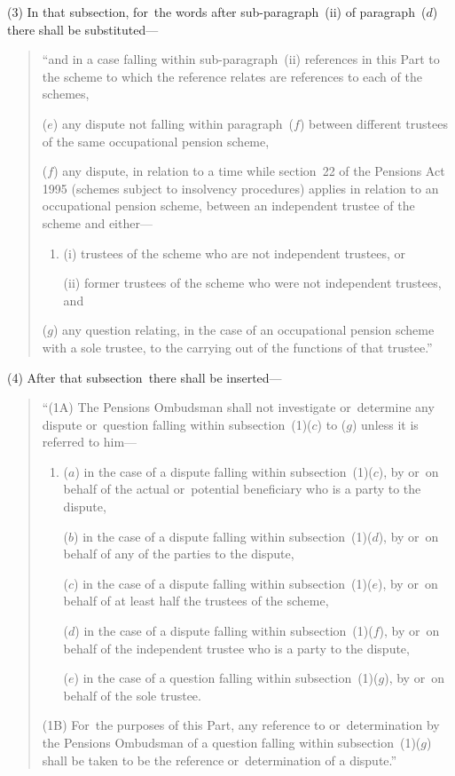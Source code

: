 \documentclass[12pt,a4paper]{article}
\begin{document}
(3) In that subsection, for~the words after sub-paragraph~(ii)  of paragraph~($d$)  there shall be substituted—
\begin{quotation}
“and in a case falling within sub-paragraph~(ii)  references in this Part to the scheme to which the reference relates are references to each of the schemes,

($e$) any dispute not falling within paragraph~($f$)  between different trustees of the same occupational pension scheme,

($f$) any dispute, in relation to a time while section~22 of the Pensions Act 1995 (schemes subject to insolvency procedures) applies in relation to an occupational pension scheme, between an independent trustee of the scheme and either—
\begin{enumerate}\item[]
\begin{sloppypar}
(i) trustees of the scheme who are not independent trustees, or
\end{sloppypar}

(ii) former trustees of the scheme who were not independent trustees, and
\end{enumerate}

($g$) any question relating, in the case of an occupational pension scheme with a sole trustee, to the carrying out of the functions of that trustee.”
\end{quotation}

(4) After that subsection~there shall be inserted—
\begin{quotation}
“(1A) The Pensions Ombudsman shall not investigate or~determine any dispute or~question falling within subsection~(1)($c$)  to ($g$)  unless it is referred to him—
\begin{enumerate}\item[]
($a$) in the case of a dispute falling within subsection~(1)($c$), by or~on behalf of the actual or~potential beneficiary who is a party to the dispute,

($b$) in the case of a dispute falling within subsection~(1)($d$), by or~on behalf of any of the parties to the dispute,

($c$) in the case of a dispute falling within subsection~(1)($e$), by or~on behalf of at least half the trustees of the scheme,

($d$) in the case of a dispute falling within subsection~(1)($f$), by or~on behalf of the independent trustee who is a party to the dispute,

($e$) in the case of a question falling within subsection~(1)($g$), by or~on behalf of the sole trustee.
\end{enumerate}

(1B) For~the purposes of this Part, any reference to or~determination by the Pensions Ombudsman of a question falling within subsection~(1)($g$)  shall be taken to be the reference or~determination of a dispute.”
\end{quotation}
\end{document}

